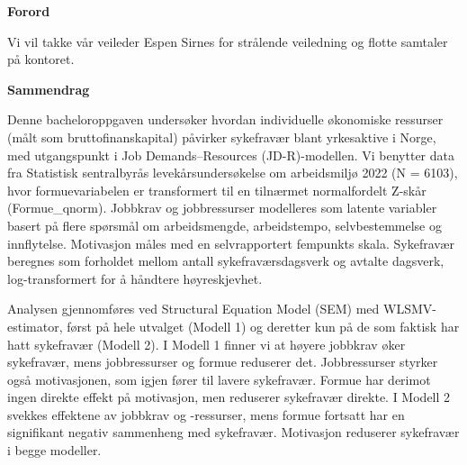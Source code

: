 \documentclass[
  12pt,
  a4paper,
  DIV=11,
  numbers=noendperiod]{scrartcl}
\renewcommand*\contentsname{Table of contents}
\newcommand\contentsname{Table of contents}
\begin{document}




\thispagestyle{plain}
\begin{center}
    \Large
    \textbf{Forord}
\end{center}

Vi vil takke vår veileder Espen Sirnes for strålende veiledning og
flotte samtaler på kontoret.

\newpage
\hypersetup{linkcolor=black}
\renewcommand{\contentsname}{Innholdsfortegnelse}
\renewcommand*{\figureautorefname}{Figur}
\renewcommand*{\tableautorefname}{Tabell}
\renewcommand*{\equationautorefname}{Ligning}
\renewcommand*{\sectionautorefname}{Kapittel}
\renewcommand*{\subsectionautorefname}{Underkapittel}
\renewcommand*{\subsubsectionautorefname}{Delkapittel}
\tableofcontents
\listoffigures
\listoftables
\hypersetup{linkcolor=blue}
\newpage
\thispagestyle{plain}
\begin{center}
    \Large
    \textbf{Sammendrag}
\end{center}

Denne bacheloroppgaven undersøker hvordan individuelle økonomiske
ressurser (målt som bruttofinanskapital) påvirker sykefravær blant
yrkesaktive i Norge, med utgangspunkt i Job Demands--Resources
(JD-R)-modellen. Vi benytter data fra Statistisk sentralbyrås
levekårsundersøkelse om arbeidsmiljø 2022 (N = 6103), hvor
formuevariabelen er transformert til en tilnærmet normalfordelt Z-skår
(Formue\_qnorm). Jobbkrav og jobbressurser modelleres som latente
variabler basert på flere spørsmål om arbeidsmengde, arbeidstempo,
selvbestemmelse og innflytelse. Motivasjon måles med en selvrapportert
fempunkts skala. Sykefravær beregnes som forholdet mellom antall
sykefraværsdagsverk og avtalte dagsverk, log-transformert for å håndtere
høyreskjevhet.

Analysen gjennomføres ved Structural Equation Model (SEM) med
WLSMV-estimator, først på hele utvalget (Modell 1) og deretter kun på de
som faktisk har hatt sykefravær (Modell 2). I Modell 1 finner vi at
høyere jobbkrav øker sykefravær, mens jobbressurser og formue reduserer
det. Jobbressurser styrker også motivasjonen, som igjen fører til lavere
sykefravær. Formue har derimot ingen direkte effekt på motivasjon, men
reduserer sykefravær direkte. I Modell 2 svekkes effektene av jobbkrav
og -ressurser, mens formue fortsatt har en signifikant negativ
sammenheng med sykefravær. Motivasjon reduserer sykefravær i begge
modeller.
\end{document}
